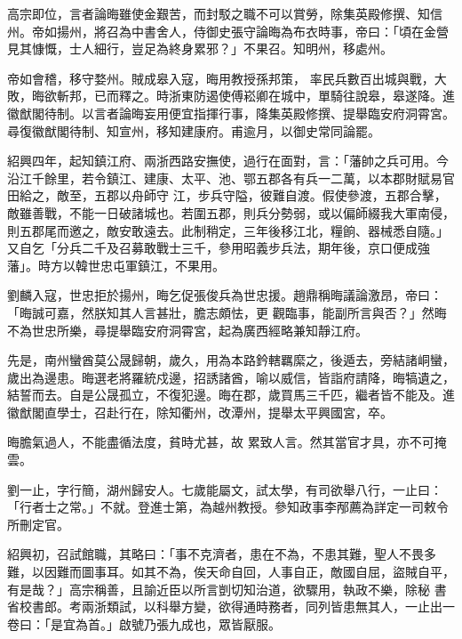\begin{pinyinscope}
 高宗即位，言者論晦雖使金艱苦，而封駁之職不可以賞勞，除集英殿修撰、知信州。帝如揚州，將召為中書舍人，侍御史張守論晦為布衣時事，帝曰：「頃在金營見其慷慨，士人細行，豈足為終身累邪？」不果召。知明州，移處州。



 帝如會稽，移守婺州。賊成皋入寇，晦用教授孫邦策，
 率民兵數百出城與戰，大敗，晦欲斬邦，已而釋之。時浙東防遏使傅崧卿在城中，單騎往說皋，皋遂降。進徽猷閣待制。以言者論晦妄用便宜指揮行事，降集英殿修撰、提舉臨安府洞霄宮。尋復徽猷閣待制、知宣州，移知建康府。甫逾月，以御史常同論罷。



 紹興四年，起知鎮江府、兩浙西路安撫使，過行在面對，言：「藩帥之兵可用。今沿江千餘里，若令鎮江、建康、太平、池、鄂五郡各有兵一二萬，以本郡財賦易官田給之，敵至，五郡以舟師守
 江，步兵守隘，彼難自渡。假使參渡，五郡合擊，敵雖善戰，不能一日破諸城也。若圍五郡，則兵分勢弱，或以偏師綴我大軍南侵，則五郡尾而邀之，敵安敢遠去。此制稍定，三年後移江北，糧餉、器械悉自隨。」又自乞「分兵二千及召募敢戰士三千，參用昭義步兵法，期年後，京口便成強藩」。時方以韓世忠屯軍鎮江，不果用。



 劉麟入寇，世忠拒於揚州，晦乞促張俊兵為世忠援。趙鼎稱晦議論激昂，帝曰：「晦誠可嘉，然朕知其人言甚壯，膽志頗怯，更
 觀臨事，能副所言與否？」然晦不為世忠所樂，尋提舉臨安府洞霄宮，起為廣西經略兼知靜江府。



 先是，南州蠻酋莫公晟歸朝，歲久，用為本路鈐轄羈縻之，後遁去，旁結諸峒蠻，歲出為邊患。晦選老將羅統戍邊，招誘諸酋，喻以威信，皆詣府請降，晦犒遺之，結誓而去。自是公晟孤立，不復犯邊。晦在郡，歲買馬三千匹，繼者皆不能及。進徽猷閣直學士，召赴行在，除知衢州，改潭州，提舉太平興國宮，卒。



 晦膽氣過人，不能盡循法度，貧時尤甚，故
 累致人言。然其當官才具，亦不可掩雲。



 劉一止，字行簡，湖州歸安人。七歲能屬文，試太學，有司欲舉八行，一止曰：「行者士之常。」不就。登進士第，為越州教授。參知政事李邴薦為詳定一司敕令所刪定官。



 紹興初，召試館職，其略曰：「事不克濟者，患在不為，不患其難，聖人不畏多難，以因難而圖事耳。如其不為，俟天命自回，人事自正，敵國自屈，盜賊自平，有是哉？」高宗稱善，且諭近臣以所言剴切知治道，欲驟用，執政不樂，除秘
 書省校書郎。考兩浙類試，以科舉方變，欲得通時務者，同列皆患無其人，一止出一卷曰：「是宜為首。」啟號乃張九成也，眾皆厭服。




\end{pinyinscope}
